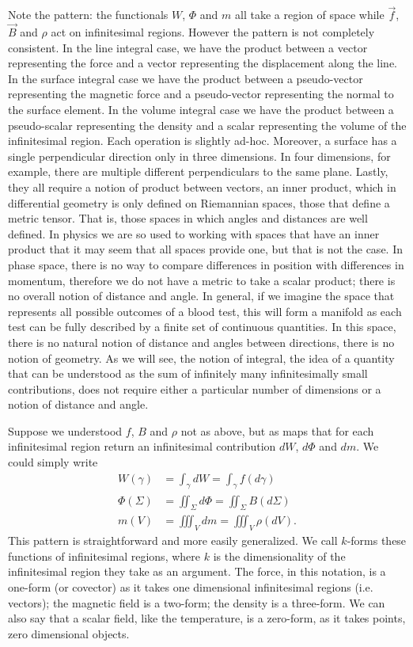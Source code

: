 Note the pattern: the functionals $W$, $\Phi$ and $m$ all take a region of space while $\vec{f}$, $\vec{B}$ and $\rho$ act on infinitesimal regions. However the pattern is not completely consistent. In the line integral case, we have the product between a vector representing the force and a vector representing the displacement along the line. In the surface integral case we have the product between a pseudo-vector representing the magnetic force and a pseudo-vector representing the normal to the surface element. In the volume integral case we have the product between a pseudo-scalar representing the density and a scalar representing the volume of the infinitesimal region. Each operation is slightly ad-hoc. Moreover, a surface has a single perpendicular direction only in three dimensions. In four dimensions, for example, there are multiple different perpendiculars to the same plane. Lastly, they all require a notion of product between vectors, an inner product, which in differential geometry is only defined on Riemannian spaces, those that define a metric tensor. That is, those spaces in which angles and distances are well defined. In physics we are so used to working with spaces that have an inner product that it may seem that all spaces provide one, but that is not the case. In phase space, there is no way to compare differences in position with differences in momentum, therefore we do not have a metric to take a scalar product; there is no overall notion of distance and angle. In general, if we imagine the space that represents all possible outcomes of a blood test, this will form a manifold as each test can be fully described by a finite set of continuous quantities. In this space, there is no natural notion of distance and angles between directions, there is no notion of geometry. As we will see, the notion of integral, the idea of a quantity that can be understood as the sum of infinitely many infinitesimally small contributions, does not require either a particular number of dimensions or a notion of distance and angle.

Suppose we understood $f$, $B$ and $\rho$ not as above, but as maps that for each infinitesimal region return an infinitesimal contribution $dW$, $d\Phi$ and $dm$. We could simply write
\begin{equation*}
	\begin{aligned}
		W(\gamma) &= \int_\gamma dW = \int_\gamma f(d\gamma) \\
		\Phi(\Sigma) &= \iint_\Sigma d\Phi = \iint_\Sigma B(d\Sigma) \\
		m(V) &= \iiint_V dm = \iiint_V \rho(dV).
	\end{aligned}
\end{equation*}
This pattern is straightforward and more easily generalized. We call $k$-forms these functions of infinitesimal regions, where $k$ is the dimensionality of the infinitesimal region they take as an argument. The force, in this notation, is a one-form (or covector) as it takes one dimensional infinitesimal regions (i.e. vectors); the magnetic field is a two-form; the density is a three-form. We can also say that a scalar field, like the temperature, is a zero-form, as it takes points, zero dimensional objects.

